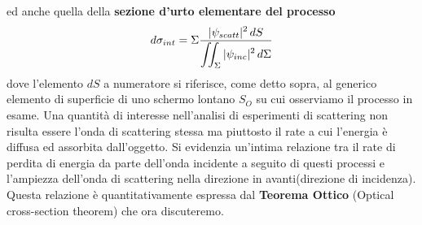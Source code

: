 ed anche quella della \textbf{sezione d'urto elementare del processo}
\begin{equation}
	d \sigma_{int} = \Sigma \fraclarg{|\psi_{scatt}|^2 \, dS}{\iint_{\Sigma}|\psi_{inc}|^2 \, d \Sigma}
	\label{eq:differential-interaction-cross-section}
\end{equation}
dove l'elemento \(dS\) a numeratore si riferisce, come
detto sopra, al generico elemento di superficie di uno schermo lontano
\(S_O\) su cui osserviamo il processo in esame.
%
%
\bigbreak
Una quantità di interesse nell'analisi di esperimenti di scattering non risulta essere l'onda di scattering stessa ma
piuttosto il rate a cui l'energia è diffusa ed assorbita dall'oggetto.
Si evidenzia un'intima relazione tra il rate di perdita di energia da parte dell'onda incidente a seguito di questi processi
e l'ampiezza dell'onda di scattering nella direzione in avanti(direzione di incidenza).
Questa relazione è quantitativamente espressa dal \textbf{Teorema Ottico} (Optical cross-section theorem) che ora discuteremo.

